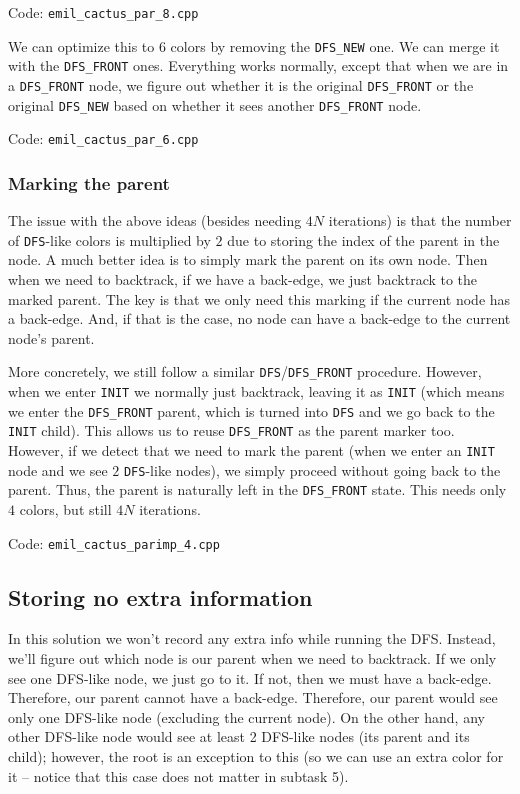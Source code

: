 \documentclass{article}
\begin{document}
Code: \verb|emil_cactus_par_8.cpp|

We can optimize this to $6$ colors by removing the \verb|DFS_NEW| one. We can merge it with the \verb|DFS_FRONT| ones. Everything works normally, except that when we are in a \verb|DFS_FRONT| node, we figure out whether it is the original \verb|DFS_FRONT| or the original \verb|DFS_NEW| based on whether it sees another \verb|DFS_FRONT| node.

Code: \verb|emil_cactus_par_6.cpp|

\subsubsection{Marking the parent}

The issue with the above ideas (besides needing $4N$ iterations) is that the number of \verb|DFS|-like colors is multiplied by $2$ due to storing the index of the parent in the node. A much better idea is to simply mark the parent on its own node. Then when we need to backtrack, if we have a back-edge, we just backtrack to the marked parent. The key is that we only need this marking if the current node has a back-edge. And, if that is the case, no node can have a back-edge to the current node's parent.

More concretely, we still follow a similar \verb|DFS|/\verb|DFS_FRONT| procedure. However, when we enter \verb|INIT| we normally just backtrack, leaving it as \verb|INIT| (which means we enter the \verb|DFS_FRONT| parent, which is turned into \verb|DFS| and we go back to the \verb|INIT| child). This allows us to reuse \verb|DFS_FRONT| as the parent marker too. However, if we detect that we need to mark the parent (when we enter an \verb|INIT| node and we see $2$ \verb|DFS|-like nodes), we simply proceed without going back to the parent. Thus, the parent is naturally left in the \verb|DFS_FRONT| state. This needs only $4$ colors, but still $4N$ iterations.

Code: \verb|emil_cactus_parimp_4.cpp|

\subsection{Storing no extra information}

In this solution we won't record any extra info while running the DFS. Instead, we'll figure out which node is our parent when we need to backtrack. If we only see one DFS-like node, we just go to it. If not, then we must have a back-edge. Therefore, our parent cannot have a back-edge. Therefore, our parent would see only one DFS-like node (excluding the current node). On the other hand, any other DFS-like node would see at least 2 DFS-like nodes (its parent and its child); however, the root is an exception to this (so we can use an extra color for it -- notice that this case does not matter in subtask 5).
\end{document}
